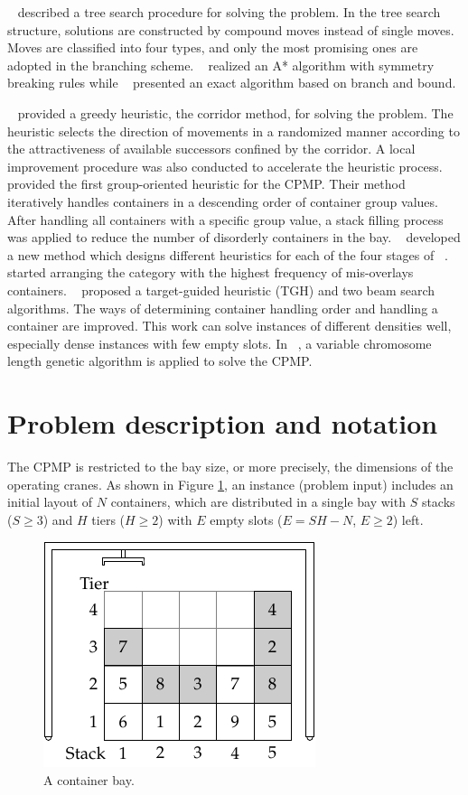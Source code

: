 \documentclass[review,3p,times,12pt,number]{elsarticle}\usepackage{amsmath}\usepackage{amssymb}
\renewcommand{\citet}[1]{\citeauthor{#1}~\citep{#1}}
\begin{document}
\citet{bort2012} described a tree search procedure for solving the problem.
In the tree search structure, solutions are constructed by compound moves instead of single moves. Moves are classified into four types, and only the most promising ones are adopted in the branching scheme. \citet{tierney2014} realized an A* algorithm with symmetry breaking rules while \citet{van2014} presented an exact algorithm based on branch and bound.


\citet{cas2009} provided a greedy heuristic, the corridor method, for solving the problem. The heuristic selects the direction of movements in a randomized manner according to the attractiveness of available successors confined by the corridor.
A local improvement procedure was also conducted to accelerate the heuristic process.
\citet{exp2012} provided the first group-oriented heuristic for the CPMP\@. Their method iteratively handles containers in a descending order of container group values. After handling all containers with a specific group value, a stack filling process was applied to reduce the number of disorderly containers in the bay.
\citet{jovanovic2014} developed a new method which designs different heuristics for each of the four stages of \citet{exp2012}.
\citet{Gheith2014} started arranging the category with the highest frequency of mis-overlays containers.
\citet{wang2015} proposed a target-guided heuristic (TGH) and two beam search algorithms.
The ways of determining container handling order and handling a container are improved.
This work can solve instances of different densities well, especially dense instances with few empty slots.
In \citet{Gheith2015}, a variable chromosome length genetic algorithm is applied to solve the CPMP\@.


\section{Problem description and notation}
\label{sec:problem}

The CPMP is restricted to the bay size, or more precisely, the dimensions of the operating cranes. As shown in Figure \ref{fig:bay}, an instance (problem input) includes an initial layout of $N$ containers, which are distributed in a single bay with $S$ stacks ($S\ge 3$) and $H$ tiers ($H\ge 2$) with $E$ empty slots ($E=SH-N$, $E\ge 2$) left.

\begin{figure}[htbp]
\centering
\includegraphics{figs/bay.pdf}
\caption{A container bay.}
\label{fig:bay}
\end{figure}
\end{document}
